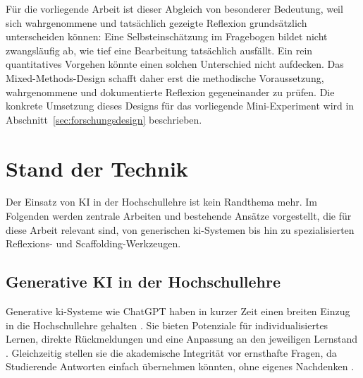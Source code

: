 Für die vorliegende Arbeit ist dieser Abgleich von besonderer Bedeutung, weil sich wahrgenommene und
tatsächlich gezeigte Reflexion grundsätzlich unterscheiden können: Eine Selbsteinschätzung im
Fragebogen bildet nicht zwangsläufig ab, wie tief eine Bearbeitung tatsächlich ausfällt. Ein rein
quantitatives Vorgehen könnte einen solchen Unterschied nicht aufdecken. Das Mixed-Methods-Design
schafft daher erst die methodische Voraussetzung, wahrgenommene und dokumentierte Reflexion
gegeneinander zu prüfen. Die konkrete Umsetzung dieses Designs für das vorliegende Mini-Experiment
wird in Abschnitt~\ref{sec:forschungsdesign} beschrieben.

\section{Stand der Technik}
\label{sec:standtechnik}

Der Einsatz von KI in der Hochschullehre ist kein Randthema mehr.
Im Folgenden werden zentrale Arbeiten und bestehende Ansätze vorgestellt, die für
diese Arbeit relevant sind, von generischen \acrshort{ki}-Systemen bis hin zu spezialisierten
Reflexions- und Scaffolding-Werkzeugen.

\subsection{Generative KI in der Hochschullehre}

Generative \acrshort{ki}-Systeme wie ChatGPT haben in kurzer Zeit einen breiten Einzug in die
Hochschullehre gehalten \cite{kasneciChatGPTGoodOpportunities2023}.
Sie bieten Potenziale für individualisiertes Lernen, direkte Rückmeldungen und eine
Anpassung an den jeweiligen Lernstand \cite{baidoo-anuEducationEraGenerative2023}.
Gleichzeitig stellen sie die akademische Integrität vor ernsthafte Fragen, da Studierende
Antworten einfach übernehmen könnten, ohne eigenes Nachdenken \cite{cottonChattingCheatingEnsuring2024, nikolicChatGPTCopilotGemini2024}.

